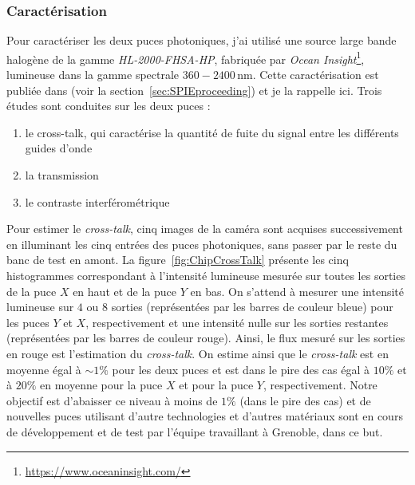\subsubsection{Caractérisation}
\label{sec:ChipCharacterization}

Pour caractériser les deux puces photoniques, j'ai utilisé une source large bande halogène de la gamme \textit{HL-2000-FHSA-HP}, fabriquée par \textit{Ocean Insight}\footnote{\url{https://www.oceaninsight.com/}}, lumineuse dans la gamme spectrale $360 - 2400 \,$nm. Cette caractérisation est publiée dans \cite{barjot2020} (voir la section~\ref{sec:SPIEproceeding}) et je la rappelle ici. Trois études sont conduites sur les deux puces :

\begin{enumerate}
    \item le cross-talk, qui caractérise la quantité de fuite du signal entre les différents guides d'onde
    \item la transmission
    \item le contraste interférométrique
\end{enumerate}



Pour estimer le \textit{cross-talk}, cinq images de la caméra sont acquises successivement en illuminant les cinq entrées des puces photoniques, sans passer par le reste du banc de test en amont. La figure~\ref{fig:ChipCrossTalk} présente les cinq histogrammes correspondant à l'intensité lumineuse mesurée sur toutes les sorties de la puce $X$ en haut et de la puce $Y$ en bas. On s'attend à mesurer une intensité lumineuse sur $4$ ou $8$ sorties (représentées par les barres de couleur bleue) pour les puces $Y$ et $X$, respectivement et une intensité nulle sur les sorties restantes (représentées par les barres de couleur rouge). Ainsi, le flux mesuré sur les sorties en rouge est l'estimation du \textit{cross-talk}. On estime ainsi que le \textit{cross-talk} est en moyenne égal à $\sim 1\%$ pour les deux puces et est dans le pire des cas égal à $10 \%$ et à $20 \%$ en moyenne pour la puce $X$ et pour la puce $Y$, respectivement. Notre objectif est d'abaisser ce niveau à moins de $1\%$ (dans le pire des cas) et de nouvelles puces utilisant d'autre technologies et d'autres matériaux sont en cours de développement et de test par l'équipe travaillant à Grenoble, dans ce but.

